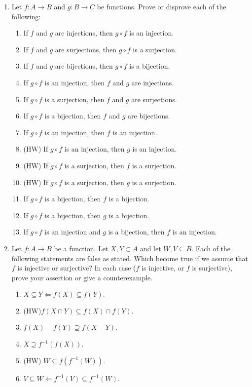 \documentclass[12pt, reqno]{amsart}
\begin{document}
\begin{enumerate}
\newpage
\item   Let $f\colon A \to B$ and $g \colon B \to C$ be functions. Prove or
  disprove each of the following:
  \begin{enumerate}
  \item If $f$ and $g$ are injections, then $g \circ f$ is an injection.
  \item If $f$ and $g$ are surjections, then $g \circ f$ is a surjection.
  \item If $f$ and $g$ are bijections, then $g \circ f$ is a bijection.
  \item If $g \circ f$ is an injection, then $f$ and $g$ are injections.
  \item If $g \circ f$ is a surjection, then $f$ and $g$ are surjections.
  \item If $g \circ f$ is a bijection, then $f$ and $g$ are bijections.
  \item If $g \circ f$ is an injection, then $f$ is an injection.
  \item (HW) If $g \circ f$ is an injection, then $g$ is an injection.
  \item (HW) If $g \circ f$ is a surjection, then $f$ is a surjection.
  \item (HW) If $g \circ f$ is a surjection, then $g$ is a surjection.
  \item If $g \circ f$ is a bijection, then $f$ is a bijection.
  \item If $g \circ f$ is a bijection, then $g$ is a bijection.
  \item If $g \circ f$ is an injection and $g$ is a bijection, then $f$ is an
    injection.
  \end{enumerate}

\vspace{1in}

\item Let $f\colon A \to B$ be a function. Let $X,Y \subset
  A$ and let $W,V \subseteq B$. Each of the following statements are false as stated. Which
  become true if we assume that $f$ is injective or surjective? In
  each case ($f$ is injective, or $f$ is surjective), prove your
  assertion or give a counterexample.
  \begin{enumerate}
  \item $X \subseteq Y \Leftarrow f(X) \subseteq f(Y)$.
  \item (HW)$f(X \cap Y) \subseteq f(X) \cap f(Y)$.
  \item $f(X) - f(Y) \supseteq f(X - Y)$.
  \item $X \supseteq f^{-1}(f(X))$.
  \item (HW) $W \subseteq f(f^{-1}(W))$.
  \item $V \subseteq W \Leftarrow f^{-1}(V) \subseteq f^{-1}(W)$.
  \end{enumerate}

\end{enumerate}
\end{document}
